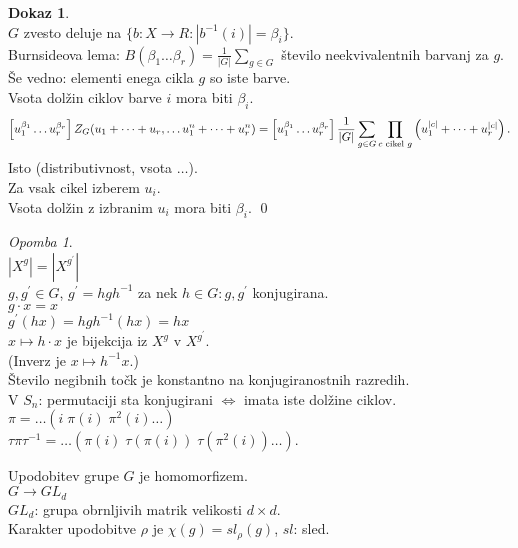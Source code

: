 \documentclass[a4paper, 12pt]{book}
\theoremstyle{definition}
\newtheorem{pro}[counter]{Dokaz}
\theoremstyle{remark}
\newtheorem*{rem}{Opomba}
\begin{document}
\begin{pro} \text{} \\
  $G$ zvesto deluje na $\{b: X \to R: \left|b^{-1}(i)\right| = \beta_i\}$. \\
  Burnsideova lema: $B(\beta_1 \dots \beta_r) = \frac{1}{|G|} \sum_{g \in G}$ število neekvivalentnih barvanj za $g$. \\
  Še vedno: elementi enega cikla $g$ so iste barve. \\
  Vsota dolžin ciklov barve $i$ mora biti $\beta_i$.
  \begin{equation*}
    \left[u_1^{\beta_1} \dots u_r^{\beta_r}\right] Z_G(u_1 + \dots + u_r, \dots u_1^n + \dots + u_r^n) \\
    = \left[u_1^{\beta_1} \dots u_r^{\beta_r}\right] \frac{1}{|G|} \sum_{g \in G} \prod_{c \text{ cikel } g}
      \left(u_1^{|c|} + \dots + u_r^{|c|}\right).
  \end{equation*}
  Isto (distributivnost, vsota $\dots$). \\
  Za vsak cikel izberem $u_i$. \\
  Vsota dolžin z izbranim $u_i$ mora biti $\beta_i$.
  \qed
\end{pro}
\begin{rem} \text{} \\
  $\left|X^g\right| = \left|X^{g^{'}}\right|$ \\
  $g, g^{'} \in G$, $g^{'} = h g h^{-1}$ za nek $h \in G: g, g^{'}$ konjugirana. \\
  $g \cdot x = x$ \\
  $g^{'} (h x) = h g h^{-1} (h x) = h x$ \\
  $x \mapsto h \cdot x$ je bijekcija iz $X^g$ v $X^{g^{'}}$. \\
  (Inverz je $x \mapsto h^{-1} x$.) \\
  Število negibnih točk je konstantno na konjugiranostnih razredih. \\
  V $S_n$: permutaciji sta konjugirani $\iff$ imata iste dolžine ciklov. \\
  $\pi = \dots (i \; \pi(i) \; \pi^2(i) \dots)$ \\
  $\tau \pi \tau^{-1} = \dots (\pi(i) \; \tau(\pi(i)) \; \tau\left(\pi^2(i)\right) \dots)$.
\end{rem}
Upodobitev grupe $G$ je homomorfizem. \\
$G \to GL_d$ \\
$GL_d$: grupa obrnljivih matrik velikosti $d \times d$. \\
Karakter upodobitve $\rho$ je $\chi(g) = sl_{\rho}(g)$, $sl$: sled. \\
\end{document}
